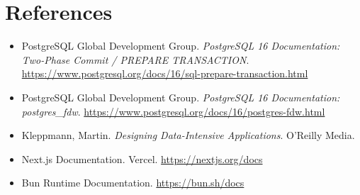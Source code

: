 \chapter{References}

\begin{itemize}
    \item PostgreSQL Global Development Group. \textit{PostgreSQL 16 Documentation: Two-Phase Commit / PREPARE TRANSACTION}. \url{https://www.postgresql.org/docs/16/sql-prepare-transaction.html}
    \item PostgreSQL Global Development Group. \textit{PostgreSQL 16 Documentation: postgres\_fdw}. \url{https://www.postgresql.org/docs/16/postgres-fdw.html}
    \item Kleppmann, Martin. \textit{Designing Data-Intensive Applications}. O'Reilly Media.
    \item Next.js Documentation. Vercel. \url{https://nextjs.org/docs}
    \item Bun Runtime Documentation. \url{https://bun.sh/docs}
\end{itemize}
